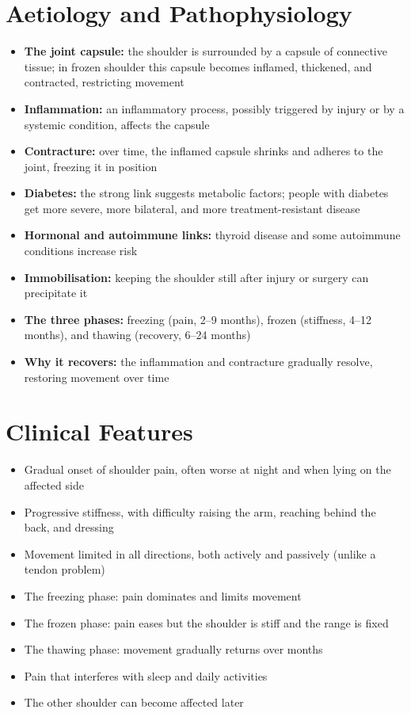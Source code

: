 \section*{Aetiology and Pathophysiology}
\begin{itemize}
    \item \textbf{The joint capsule:} the shoulder is surrounded by a capsule of connective tissue; in frozen shoulder this capsule becomes inflamed, thickened, and contracted, restricting movement
    \item \textbf{Inflammation:} an inflammatory process, possibly triggered by injury or by a systemic condition, affects the capsule
    \item \textbf{Contracture:} over time, the inflamed capsule shrinks and adheres to the joint, freezing it in position
    \item \textbf{Diabetes:} the strong link suggests metabolic factors; people with diabetes get more severe, more bilateral, and more treatment-resistant disease
    \item \textbf{Hormonal and autoimmune links:} thyroid disease and some autoimmune conditions increase risk
    \item \textbf{Immobilisation:} keeping the shoulder still after injury or surgery can precipitate it
    \item \textbf{The three phases:} freezing (pain, 2--9 months), frozen (stiffness, 4--12 months), and thawing (recovery, 6--24 months)
    \item \textbf{Why it recovers:} the inflammation and contracture gradually resolve, restoring movement over time
\end{itemize}

\section*{Clinical Features}
\begin{itemize}
    \item Gradual onset of shoulder pain, often worse at night and when lying on the affected side
    \item Progressive stiffness, with difficulty raising the arm, reaching behind the back, and dressing
    \item Movement limited in all directions, both actively and passively (unlike a tendon problem)
    \item The freezing phase: pain dominates and limits movement
    \item The frozen phase: pain eases but the shoulder is stiff and the range is fixed
    \item The thawing phase: movement gradually returns over months
    \item Pain that interferes with sleep and daily activities
    \item The other shoulder can become affected later
\end{itemize}

